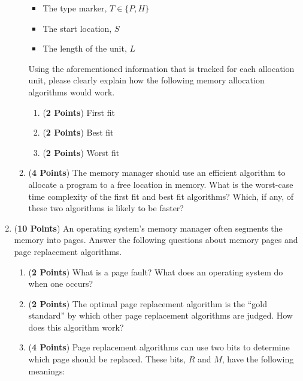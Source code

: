 \documentclass[12pt,epsf,psfig,graphics]{article}
\begin{document}
\begin{enumerate}
\begin{enumerate}
    \begin{itemize}
      \item The type marker, $T \in \{P, H\}$
      \item The start location, $S$
      \item The length of the unit, $L$
    \end{itemize}

    Using the aforementioned information that is tracked for each allocation unit, please clearly explain how the
    following memory allocation algorithms would work.

    \begin{enumerate}
      \item ({\bf 2 Points}) First fit
      \item ({\bf 2 Points}) Best fit
      \item ({\bf 2 Points}) Worst fit
    \end{enumerate}

  \item ({\bf 4 Points}) The memory manager should use an efficient algorithm to allocate a program to a free location in
    memory.  What is the worst-case time complexity of the first fit and best fit algorithms?  Which, if any, of these
    two algorithms is likely to be faster?

  \end{enumerate}

  \newpage

\item ({\bf 10 Points}) An operating system's memory manager often segments the memory into pages.  Answer the following
  questions about memory pages and page replacement algorithms.

  \begin{enumerate}

    \item ({\bf 2 Points}) What is a page fault? What does an operating system do when one occurs?

    \item ({\bf 2 Points}) The optimal page replacement algorithm is the ``gold standard'' by which other page
      replacement algorithms are judged.  How does this algorithm work? 

    \item ({\bf 4 Points}) Page replacement algorithms can use two bits to determine which page should be replaced.
      These bits, $R$ and $M$, have the following meanings:


\end{enumerate}
\end{enumerate}
\end{document}
